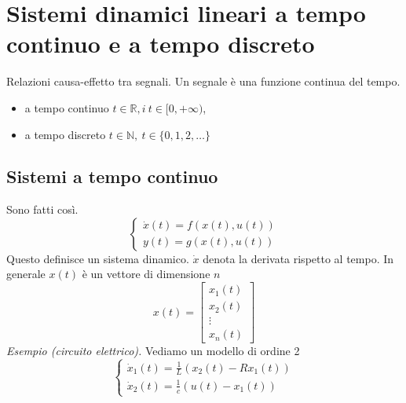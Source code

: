 \documentclass[10pt,a4paper]{book}
\begin{document}
\tableofcontents
\newpage

\pagestyle{fancy} %
\setcounter{page}{1} %




\chapter{Sistemi dinamici lineari a tempo continuo e a tempo discreto}

Relazioni causa-effetto tra segnali. Un segnale è una funzione continua del tempo.
\begin{itemize}
	\item a tempo continuo $t\in \mathbb{R} ,i\ t\in [ 0,+\infty)$,
	\item a tempo discreto $t\in \mathbb{N} ,\ t\in \{0,1,2,\dotsc \}$
\end{itemize}

\section{Sistemi a tempo continuo}

Sono fatti così.
\begin{equation*}
	\boxed{
		\begin{cases}
			\dot{x} (t)=f(x(t),u(t)) \\
			y(t)=g(x(t),u(t))      
		\end{cases}
	}
\end{equation*}
Questo definisce un sistema dinamico. $\dot{x}$ denota la derivata rispetto al tempo. In generale $x(t)$ è un vettore di dimensione $n$
\begin{equation*}
	x(t) =\begin{bmatrix}
	x_1(t)\\
	x_2(t)\\
	\vdots \\
	x_n(t)
	\end{bmatrix}
\end{equation*}
\textit{Esempio (circuito elettrico).} Vediamo un modello di ordine 2
\begin{equation*}
	\begin{cases}
		\dot{x}_1 (t)=\frac{1}{L}(x_2 (t)-Rx_1 (t)) \\
		\dot{x}_2 (t)=\frac{1}{c}(u(t)-x_1 (t))       
	\end{cases}
\end{equation*}
\end{document}
